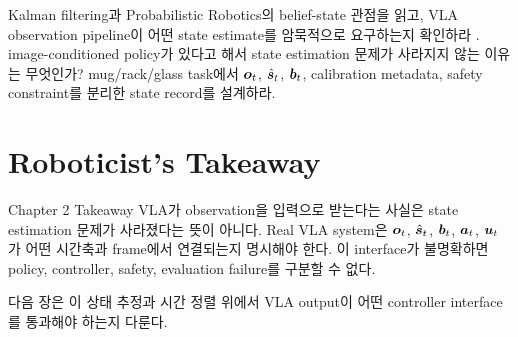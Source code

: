 \chapterwork
{Kalman filtering과 Probabilistic Robotics의 belief-state 관점을 읽고, VLA observation pipeline이 어떤 state estimate를 암묵적으로 요구하는지 확인하라 \cite{kalman1960,thrun2005}.}
{image-conditioned policy가 있다고 해서 state estimation 문제가 사라지지 않는 이유는 무엇인가?}
{mug/rack/glass task에서 $\bm{o}_t$, $\hat{\bm{s}}_t$, $\bm{b}_t$, calibration metadata, safety constraint를 분리한 state record를 설계하라.}

\section{Roboticist's Takeaway}

\begin{definitionbox}{Chapter 2 Takeaway}
VLA가 observation을 입력으로 받는다는 사실은 state estimation 문제가 사라졌다는 뜻이 아니다. Real VLA system은 $\bm{o}_t$, $\hat{\bm{s}}_t$, $\bm{b}_t$, $\bm{a}_t$, $\bm{u}_t$가 어떤 시간축과 frame에서 연결되는지 명시해야 한다. 이 interface가 불명확하면 policy, controller, safety, evaluation failure를 구분할 수 없다.
\end{definitionbox}

다음 장은 이 상태 추정과 시간 정렬 위에서 VLA output이 어떤 controller interface를 통과해야 하는지 다룬다.
